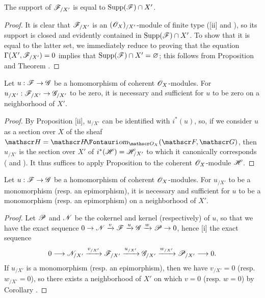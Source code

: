 \begin{corollary}[10.8.12]
\label{1.10.8.12}
The support of $\mathscr{F}_{/X'}$ is equal to $\operatorname{Supp}(\mathscr{F})\cap X'$.
\end{corollary}

\begin{proof}
\label{proof-1.10.8.12}
It is clear that $\mathscr{F}_{/X'}$ is an $(\mathscr{O}_X)_{/X'}$-module of finite type ([ii] and ),
so its support is closed  and evidently contained in $\operatorname{Supp}(\mathscr{F})\cap X'$.
To show that it is equal to the latter set, we immediately reduce to proving that the equation $\Gamma(X',\mathscr{F}_{/X'})=0$ implies that $\operatorname{Supp}(\mathscr{F})\cap X'=\varnothing$; this follows from Proposition  and Theorem .
\end{proof}

\begin{corollary}[10.8.13]
\label{1.10.8.13}
Let $u:\sh{F}\to\sh{G}$ be a homomorphism of coherent $\mathscr{O}_X$-modules.
For $u_{/X'}:\sh{F}_{/X'}\to\sh{G}_{/X'}$ to be zero, it is necessary and sufficient for $u$ to be zero on a neighborhood of $X'$.
\end{corollary}

\begin{proof}
\label{proof-1.10.8.13}
By Proposition [ii], $u_{/X'}$ can be identified with $i^*(u)$, so, if we consider $u$ as a section over $X$ of the sheaf $\sh{H}=\shHom_{\sh{O}_X}(\sh{F},\sh{G})$, then $u_{/X'}$ is the section over $X'$ of $i^*(\mathscr{H})=\mathscr{H}_{/X'}$ to which it canonically corresponds ( and ).
It thus suffices to apply Proposition  to the coherent $\mathscr{O}_X$-module $\mathscr{H}$.
\end{proof}

\begin{corollary}[10.8.14]
\label{1.10.8.14}
Let $u:\sh{F}\to\sh{G}$ be a homomorphism of coherent $\mathscr{O}_X$-modules.
For $u_{/X'}$ to be a monomorphism (resp. an epimorphism), it is necessary and sufficient for $u$ to be a monomorphism (resp. an epimorphism) on a neighborhood of $X'$.
\end{corollary}

\begin{proof}
\label{proof-1.10.8.14}
Let $\mathscr{P}$ and $\mathscr{N}$ be the cokernel and kernel (respectively) of $u$, so that we have the exact sequence $0\to\sh{N}\xrightarrow{v}\sh{F}\xrightarrow{u}\sh{G}\xrightarrow{w}\sh{P}\to 0$, hence [i] the exact sequence
\[
  0\to\sh{N}_{/X'}\xrightarrow{v_{/X'}}\sh{F}_{/X'}\xrightarrow{u_{/X'}}\sh{G}_{/X'}\xrightarrow{w_{/X'}}\sh{P}_{/X'}\to 0.
\]
If $u_{/X'}$ is a monomorphism (resp. an epimorphism), then we have $v_{/X'}=0$ (resp. $w_{/X'}=0$), so there exists a neighborhood of $X'$ on which $v=0$ (resp. $w=0$) by Corollary .
\end{proof}

